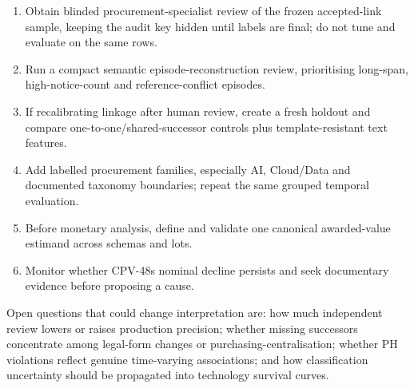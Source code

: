 \begin{enumerate}
\def\labelenumi{\arabic{enumi}.}
\tightlist
\item
  Obtain blinded procurement-specialist review of the frozen
  accepted-link sample, keeping the audit key hidden until labels are
  final; do not tune and evaluate on the same rows.
\item
  Run a compact semantic episode-reconstruction review, prioritising
  long-span, high-notice-count and reference-conflict episodes.
\item
  If recalibrating linkage after human review, create a fresh holdout
  and compare one-to-one/shared-successor controls plus
  template-resistant text features.
\item
  Add labelled procurement families, especially AI, Cloud/Data and
  documented taxonomy boundaries; repeat the same grouped temporal
  evaluation.
\item
  Before monetary analysis, define and validate one canonical
  awarded-value estimand across schemas and lots.
\item
  Monitor whether CPV-48\textquotesingle s nominal decline persists and
  seek documentary evidence before proposing a cause.
\end{enumerate}

Open questions that could change interpretation are: how much
independent review lowers or raises production precision; whether
missing successors concentrate among legal-form changes or
purchasing-centralisation; whether PH violations reflect genuine
time-varying associations; and how classification uncertainty should be
propagated into technology survival curves.

